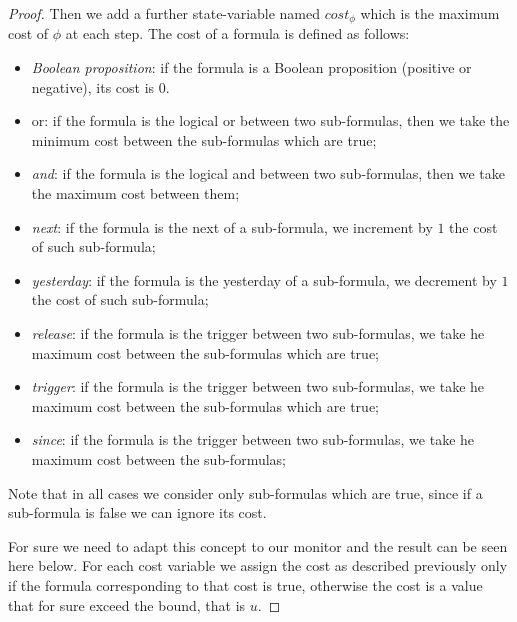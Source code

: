 \begin{theorem}
\begin{proof}
Then we add a further state-variable named $cost_\phi$ which is the maximum cost of $\phi$ at each step. The cost of a formula is defined as follows:
\begin{itemize}
    \item \textit{Boolean proposition}: if the formula is a Boolean proposition (positive or negative), its cost is $0$.
    \item or: if the formula is the logical or between two sub-formulas, then we take the minimum cost between the sub-formulas which are true;
    \item \textit{and}: if the formula is the logical and between two sub-formulas, then we take the maximum cost between them;
    \item \textit{next}: if the formula is the next of a sub-formula, we increment by $1$ the cost of such sub-formula;
    \item \textit{yesterday}: if the formula is the yesterday of a sub-formula, we decrement by $1$ the cost of such sub-formula;
    \item \textit{release}: if the formula is the trigger between two sub-formulas, we take he maximum cost between the sub-formulas which are true;
    \item \textit{trigger}: if the formula is the trigger between two sub-formulas, we take he maximum cost between the sub-formulas which are true;
    \item \textit{since}: if the formula is the trigger between two sub-formulas, we take he maximum cost between the sub-formulas;
\end{itemize}

Note that in all cases we consider only sub-formulas which are true, since if a sub-formula is false we can ignore its cost.

For sure we need to adapt this concept to our monitor and the result can be seen here below. 
For each cost variable we assign the cost as described previously only if the formula corresponding to that cost is true, otherwise the cost is a value that for sure exceed the bound, that is $u$.


\end{proof}
\end{theorem}
